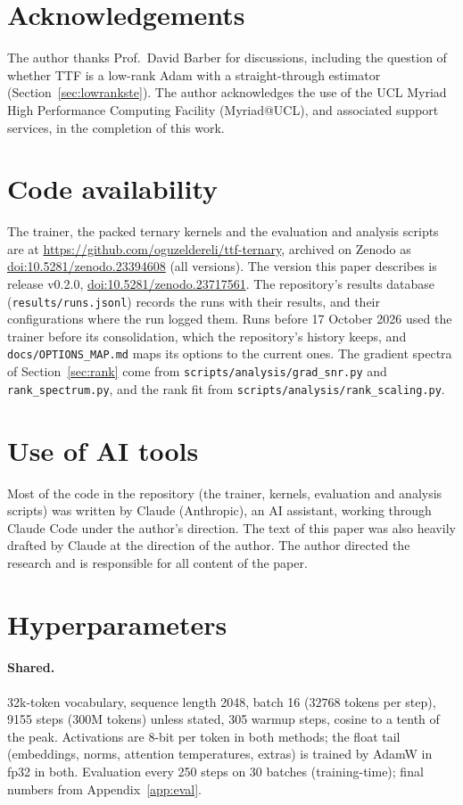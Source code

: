 \documentclass[10pt,twocolumn]{article}
\begin{document}
\section*{Acknowledgements}
The author thanks Prof.\ David Barber for discussions, including the question of whether TTF is a low-rank
Adam with a straight-through estimator (Section~\ref{sec:lowrankste}). The author acknowledges the use of the UCL Myriad High Performance Computing Facility (Myriad@UCL), and associated
support services, in the completion of this work.

\section*{Code availability}
The trainer, the packed ternary kernels and the evaluation and analysis scripts are at
\url{https://github.com/oguzeldereli/ttf-ternary}, archived on Zenodo as
\href{https://doi.org/10.5281/zenodo.23394608}{doi:10.5281/zenodo.23394608} (all versions). The version this paper describes is
release v0.2.0, \href{https://doi.org/10.5281/zenodo.23717561}{doi:10.5281/zenodo.23717561}. The repository's results database
(\texttt{results/runs.jsonl}) records the runs with their results, and their configurations where the run logged them. Runs before 17 October 2026 used
the trainer before its consolidation, which the repository's history keeps, and \texttt{docs/OPTIONS\_MAP.md} maps its
options to the current ones. The gradient spectra of Section~\ref{sec:rank} come from \texttt{scripts/analysis/grad\_snr.py} and
\texttt{rank\_spectrum.py}, and the rank fit from \texttt{scripts/analysis/rank\_scaling.py}.

\section*{Use of AI tools}
Most of the code in the repository (the trainer, kernels, evaluation and analysis scripts) was written by Claude
(Anthropic), an AI assistant, working through Claude Code under the author's direction. The text of this paper was
also heavily drafted by Claude at the direction of the author. The author directed the research and is responsible for
all content of the paper.

\appendix
\section{Hyperparameters}
\paragraph{Shared.} 32k-token vocabulary, sequence length 2048, batch 16 ($32768$ tokens per step), 9155 steps (300M
tokens) unless stated, 305 warmup steps, cosine to a tenth of the peak. Activations are 8-bit per token in both
methods; the float tail (embeddings, norms, attention temperatures, extras) is trained by AdamW in fp32 in both.
Evaluation every 250 steps on 30 batches (training-time); final numbers from Appendix~\ref{app:eval}.
\end{document}
